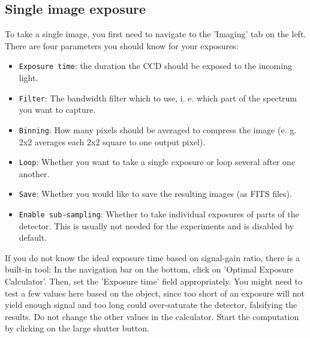 \documentclass[a4paper, 11pt, fleqn]{memoir}
\begin{document}

\subsection{Single image exposure}\label{sec:NINA:single_image_exposure}
To take a single image, you first need to navigate to the 'Imaging' tab on the left. 
There are four parameters you should know for your exposures:
\begin{itemize}
    \item \texttt{Exposure time}: the duration the CCD should be exposed to the incoming light.
    \item \texttt{Filter}: The bandwidth filter which to use, i. e. which part of the spectrum you want to capture.
    \item \texttt{Binning}: How many pixels should be averaged to compress the image (e. g. 2x2 averages each 2x2 square to one output pixel).
    \item \texttt{Loop}: Whether you want to take a single exposure or loop several after one another.
    \item \texttt{Save}: Whether you would like to save the resulting images (as FITS files).
    \item \texttt{Enable sub-sampling}: Whether to take individual exposures of parts of the detector. This is usually not needed for the experiments and is disabled by default.
\end{itemize}
If you do not know the ideal exposure time based on signal-gain ratio, there is a built-in tool: In the navigation bar on the bottom, click on 'Optimal Exposure Calculator'. Then, set the 'Exposure time' field appropriately. You might need to test a few values here based on the object, since too short of an exposure will not yield enough signal and too long could over-saturate the detector, falsifying the results. Do not change the other values in the calculator. Start the computation by clicking on the large shutter button.
\end{document}

